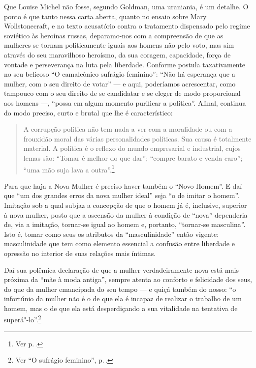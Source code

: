 Que Louise Michel não fosse, segundo Goldman, uma uraniania, é
um detalhe. O ponto é que tanto nessa carta aberta, quanto no
ensaio sobre Mary Wollstonecraft, e no texto acusatório contra o
tratamento dispensado pelo regime soviético às heroínas russas,
deparamo-nos com a compreensão de que as mulheres se tornam
politicamente iguais aos homens não pelo voto, mas sim através do seu
maravilhoso heroísmo, da sua coragem, capacidade, força de vontade e
perseverança na luta pela liberdade. Conforme postula taxativamente no
seu belicoso ``O camaleônico sufrágio feminino'': ``Não há
esperança que a mulher, com o seu direito de votar'' --- e aqui,
poderíamos acrescentar, como tampouco com o seu direito de se
candidatar e se eleger de modo proporcional aos homens ---, ``possa em
algum momento purificar a política''. Afinal, continua do modo preciso,
curto e brutal que lhe é característico:

\begin{quote}
A corrupção política não tem nada a ver com a
moralidade ou com a frouxidão moral das várias personalidades
políticas. Sua causa é totalmente material. A política é o reflexo do
mundo empresarial e industrial, cujos lemas são: ``Tomar é melhor do que
dar''; ``compre barato e venda caro''; ``uma mão suja lava a outra''.\footnote{Ver p.\,\pageref{suja}.}
\end{quote}

Para que haja a Nova Mulher é preciso haver também o ``Novo Homem''. E
daí que ``um dos grandes erros da nova mulher ideal'' seja ``o de imitar
o homem''. Imitação sob a qual subjaz a concepção de
que o homem já é, inclusive, superior à nova mulher, posto que a
ascensão da mulher à condição de ``nova'' dependeria de, via a imitação,
tornar-se igual ao homem e, portanto, ``tornar-se masculina''. Isto é,
tomar como seus os atributos da ``masculinidade'' então vigente:
masculinidade que tem como elemento essencial a confusão entre liberdade e opressão no interior de suas relações mais íntimas.

Daí sua polêmica
declaração de que a mulher verdadeiramente nova está mais próxima da
``mãe à moda antiga'', sempre atenta ao conforto e felicidade dos seus,
do que da mulher emancipada do seu tempo --- e quiçá também do nosso:
``o infortúnio da mulher não é o de que ela é incapaz de realizar o
trabalho de um homem, mas o de que ela está desperdiçando a sua
vitalidade na tentativa de superá"-lo''.\footnote{Ver ``O sufrágio feminino'', p.\,\pageref{secular}.}

